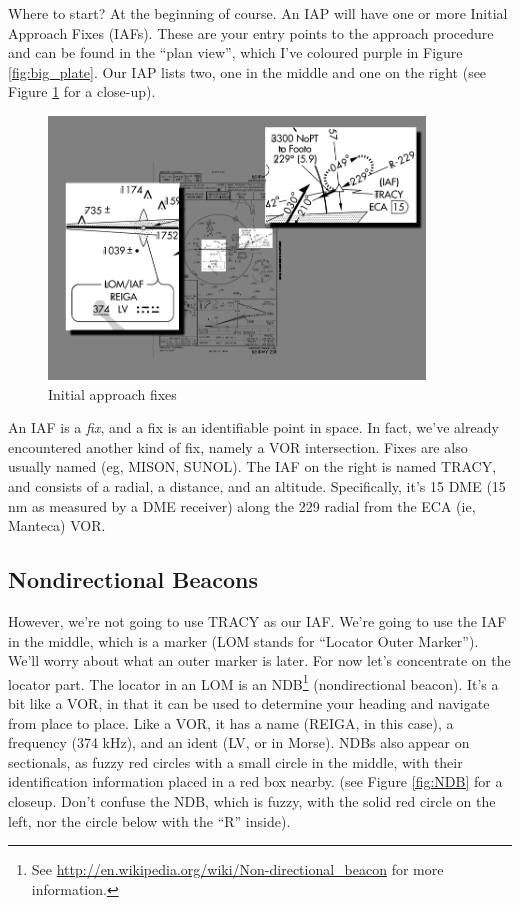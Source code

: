 Where to start?  At the beginning of course.  An IAP will have one or
more Initial Approach Fixes (IAFs).  These are your entry points to
the approach procedure and can be found in the ``plan view'', which
I've coloured purple in Figure \ref{fig:big_plate}.  Our IAP lists
two, one in the middle and one on the right (see Figure \ref{fig:IAFs}
for a close-up).

\begin{figure}
  \begin{center}
    \includegraphics[width=10cm]{img/IAFs.png}
    \caption{Initial approach fixes}
    \label{fig:IAFs}
  \end{center}
\end{figure}


An IAF is a \emph{fix}, and a fix is an identifiable point in space.
In fact, we've already encountered another kind of fix, namely a VOR
intersection.  Fixes are also usually named (eg, MISON, SUNOL).  The
IAF on the right is named TRACY, and consists of a radial, a distance,
and an altitude.  Specifically, it's 15 DME (15 nm as measured by a
DME receiver) along the 229 radial from the ECA (ie, Manteca) VOR.

\subsection{Nondirectional Beacons}

However, we're not going to use TRACY as our IAF.  We're going to use
the IAF in the middle, which is a marker (LOM stands for ``Locator
Outer Marker'').  We'll worry about what an outer marker is later.
For now let's concentrate on the locator part.  The locator in an LOM
is an NDB\footnote{See
  \url{http://en.wikipedia.org/wiki/Non-directional_beacon} for more
  information.} (nondirectional beacon).  It's a bit like a VOR, in
that it can be used to determine your heading and navigate from place
to place.  Like a VOR, it has a name (REIGA, in this case), a
frequency (374 kHz), and an ident (LV, or
{\mdot\mdash\mdot\mdot\mspace \mdot\mdot\mdot\mdash} in Morse).  NDBs
also appear on sectionals, as fuzzy red circles with a small circle in
the middle, with their identification information placed in a red box
nearby. (see Figure \ref{fig:NDB} for a closeup.  Don't confuse the
NDB, which is fuzzy, with the solid red circle on the left, nor the
circle below with the ``R'' inside).

